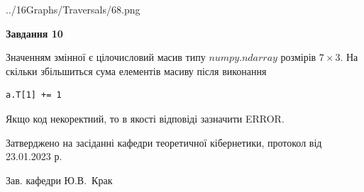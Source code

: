 \documentclass[12pt, ukrainian]{article}
\begin{document}
{\begin {large}
\begin{center}
	{../16Graphs/Traversals/68.png}
\end{center}\par
\newpage

{\begin {center}\textbf{Завдання 10}\end {center}}\par
Значенням змінної  є цілочисловий масив типу $numpy.ndarray$ розмірів $7{\times}3$. На скільки збільшиться сума елементів масиву  після виконання
\begin{verbatim}
a.T[1] += 1
\end{verbatim}


Якщо код некоректний, то в якості відповіді зазначити ERROR.\par
\newpage


\end {large}
}
{\smallskip \begin {small} Затверджено на засіданні кафедри теоретичної кібернетики, протокол  від   23.01.2023 р.\par\smallskip\smallskip
{\parbox {6.5 cm}{Зав. кафедри \dotfill Ю.В.~Крак}} \end{small}}
\end{document}
